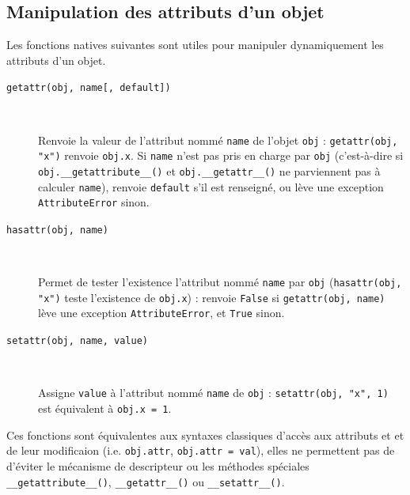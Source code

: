 \documentclass[a4paper, 10pt]{article}
\begin{document}
\subsection{Manipulation des attributs d'un objet}

Les fonctions natives suivantes sont utiles pour manipuler dynamiquement les attributs d'un objet.

\begin{description}
    \item[\texttt{getattr(obj, name[, default])}]~
    
    Renvoie la valeur de l'attribut nommé \texttt{name} de l'objet \texttt{obj} : \texttt{getattr(obj, "x")} renvoie \texttt{obj.x}. Si \texttt{name} n'est pas pris en charge par \texttt{obj} (c'est-à-dire si \texttt{obj.__getattribute__()} et \texttt{obj.__getattr__()} ne parviennent pas à calculer \texttt{name}), renvoie \texttt{default} s'il est renseigné, ou lève une exception \texttt{AttributeError} sinon.

    \item[\texttt{hasattr(obj, name)}]~
    
    Permet de tester l'existence l'attribut nommé \texttt{name} par \texttt{obj} (\texttt{hasattr(obj, "x")} teste l'existence de \texttt{obj.x}) : renvoie \texttt{False} si \texttt{getattr(obj, name)} lève une exception \texttt{AttributeError}, et \texttt{True} sinon.


    \item[\texttt{setattr(obj, name, value)}]~
    
    Assigne \texttt{value} à l'attribut nommé \texttt{name} de \texttt{obj} : \texttt{setattr(obj, "x", 1)} est équivalent à \texttt{obj.x = 1}.
    
\end{description}

Ces fonctions sont équivalentes aux syntaxes classiques d'accès aux attributs et et de leur modificaion (i.e. \texttt{obj.attr}, \texttt{obj.attr = val}), elles ne permettent pas de d'éviter le mécanisme de descripteur ou les méthodes spéciales \texttt{__getattribute__()}, \texttt{__getattr__()} ou \texttt{__setattr__()}.
\end{document}
